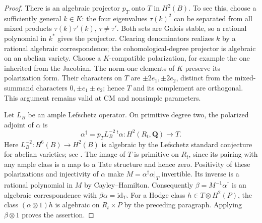 \documentclass[10pt,reqno]{article}
\theoremstyle{emphasizedplain}
\theoremstyle{emphasizeddefinition}
\theoremstyle{emphasizeddefinition}
\newcommand{\Q}{\mathbf Q}
\begin{document}
\begin{proof}
There is an algebraic projector $p_T$ onto $T$ in $H^2(B)$.
To see this, choose a sufficiently general $k\in K$: the four
eigenvalues $\tau(k)^2$ can be separated from all mixed products
$\tau(k)\tau'(k)$, $\tau\ne\tau'$. Both sets are Galois stable,
so a rational polynomial in $k^*$ gives the projector. Clearing
denominators realizes $k$ by a rational algebraic correspondence;
the cohomological-degree projector is algebraic on an abelian variety.
Choose a $K$-compatible polarization, for example the one inherited
from the Jacobian. The norm-one elements of $K$ preserve its
polarization form. Their characters on $T$ are
$\pm2e_1,\pm2e_2$, distinct from the mixed-summand characters
$0,\pm e_1\pm e_2$; hence $T$ and its complement are orthogonal.
This argument remains valid at CM and nonsimple parameters.

Let $L_B$ be an ample Lefschetz operator. On primitive degree two,
the polarized adjoint of $\alpha$ is
\[
 \alpha^\dagger=p_T L_B^{-2}\,{}^t\!\alpha:
 H^2(R_t,\Q)\longrightarrow T.
\]
Here $L_B^{-2}:H^6(B)\to H^2(B)$ is algebraic by the Lefschetz
standard conjecture for abelian varieties; see
\cite[\S5]{MilneLefschetz}. The image of $T$ is
primitive on $R_t$, since its pairing with any ample class is a
map to a Tate structure and hence zero. Positivity of these
polarizations and injectivity of $\alpha$ make
$M=\alpha^\dagger\alpha|_T$ invertible. Its inverse is a rational
polynomial in $M$ by Cayley--Hamilton. Consequently
$\beta=M^{-1}\alpha^\dagger$ is an algebraic correspondence with
$\beta\alpha=\mathrm{id}_T$.
For a Hodge class $h\in T\otimes H^2(P)$, the class
$(\alpha\otimes1)h$ is algebraic on $R_t\times P$ by the preceding
paragraph. Applying $\beta\otimes1$ proves the assertion.
\end{proof}
\end{document}
